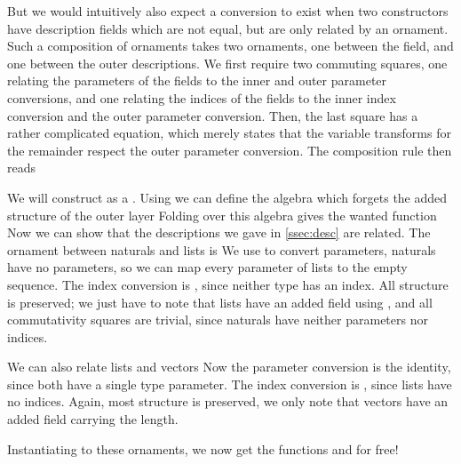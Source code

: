 But we would intuitively also expect a conversion to exist when two constructors have description fields which are not equal, but are only related by an ornament. Such a composition of ornaments takes two ornaments, one between the field, and one between the outer descriptions. We first require two commuting squares, one relating the parameters of the fields to the inner and outer parameter conversions, and one relating the indices of the fields to the inner index conversion and the outer parameter conversion. Then, the last square has a rather complicated equation, which merely states that the variable transforms for the remainder respect the outer parameter conversion. The composition rule then reads

We will construct  as a . Using
we can define the algebra which forgets the added structure of the outer layer
Folding over this algebra gives the wanted function
Now we can show that the descriptions we gave in \autoref{ssec:desc} are related. The ornament between naturals and lists is
We use \AgdaFunction{!} to convert parameters, naturals have no parameters, so we can map every parameter of lists to the empty sequence. The index conversion is , since neither type has an index. All structure is preserved; we just have to note that lists have an added field using , and all commutativity squares are trivial, since naturals have neither parameters nor indices.

We can also relate lists and vectors
Now the parameter conversion is the identity, since both have a single type parameter. The index conversion is \AgdaFunction{!}, since lists have no indices. Again, most structure is preserved, we only note that vectors have an added field carrying the length.

Instantiating  to these ornaments, we now get the functions  and  for free!



